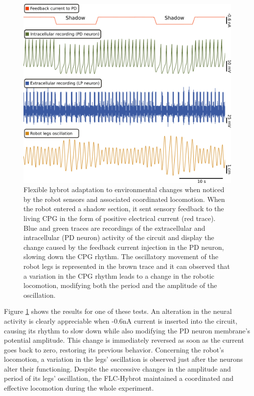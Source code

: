 \begin{figure}[hbt!]
	\begin{center}
		\includegraphics[width=0.9\linewidth]{./img/invariants/robot/robot_results_validation}
	\end{center}
	\caption{Flexible hybrot adaptation to environmental changes when noticed by the robot sensors and associated coordinated locomotion. When the robot entered a shadow section, it sent sensory feedback to the living CPG in the form of positive electrical current (red trace). Blue and green traces are recordings of the extracellular and intracellular (PD neuron) activity of the circuit and display the change caused by the feedback current injection in the PD neuron, slowing down the CPG rhythm. The oscillatory movement of the robot legs is represented in the brown trace and it can observed that a variation in the CPG rhythm leads to a change in the robotic locomotion, modifying both the period and the amplitude of the oscillation. 
	}
	\label{fig:robot_results_validation}
\end{figure}

Figure \ref{fig:robot_results_validation} shows the results for one of these tests. An alteration in the neural activity is clearly appreciable when -0.6nA current is inserted into the circuit, causing its rhythm to slow down while also modifying the PD neuron membrane's potential amplitude. This change is immediately reversed as soon as the current goes back to zero, restoring its previous behavior. Concerning the robot's locomotion, a variation in the legs' oscillation is observed just after the neurons alter their functioning. Despite the successive changes in the amplitude and period of its legs' oscillation, the FLC-Hybrot maintained a coordinated and effective locomotion during the whole experiment. 

